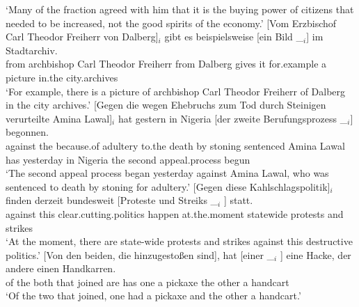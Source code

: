 \begin{sloppypar}
\glt `Many of the fraction agreed with him that it is the buying power of citizens that needed to be increased, not the good spirits of the economy.'
\ex 
\gll {}[Vom Erzbischof Carl Theodor Freiherr von Dalberg]$_i$ gibt es beispielsweise [ein Bild \_$_i$]
        im Stadtarchiv.\footnotemark\label{bsp-von-erzbischof-bilder}\\
	{}\spacebr{}from archbishop Carl Theodor Freiherr from Dalberg gives it for.example \spacebr{}a picture {} in.the city.archives\\
\glt `For example, there is a picture of archbishop Carl Theodor Freiherr of Dalberg in the city archives.'
\ex 
\gll {}[Gegen die wegen Ehebruchs zum Tod durch Steinigen verurteilte Amina Lawal]$_i$ hat gestern in Nigeria
    [der zweite Berufungsprozess \_$_i$] begonnen.\footnotemark\\
	{}\spacebr{}against the because.of adultery to.the death by stoning sentenced Amina Lawal has yesterday in Nigeria \spacebr{}the second appeal.process {} begun\\
\glt `The second appeal process began yesterday against Amina Lawal, who was sentenced to death by stoning for adultery.'
\ex 
\gll {}[Gegen diese Kahlschlagspolitik]$_i$ finden derzeit bundesweit [Proteste und Streiks \_$_i$ ] statt.\footnotemark\\
	 {}\spacebr{}against this clear.cutting.politics happen at.the.moment statewide \spacebr{}protests and strikes {} {} \prt{}\\
\glt `At the moment, there are state-wide protests and strikes against this destructive politics.'
\ex 
\gll {}[Von den beiden, die hinzugestoßen sind], hat [einer        \_$_i$ ] eine Hacke, der andere einen Handkarren.\footnotemark\\
	 {}\spacebr{}of the both that joined are has \spacebr{}one {}    {}  a pickaxe   the other a handcart\\
\glt `Of the two that joined, one had a pickaxe and the other a handcart.'

\end{sloppypar}

